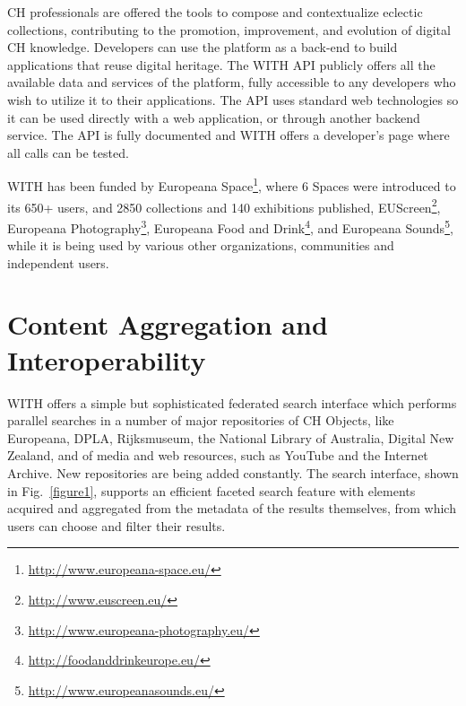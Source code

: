 \documentclass[runningheads,a4paper]{llncs}
\begin{document}
CH professionals are offered the tools to compose and contextualize eclectic collections, contributing to the promotion, improvement, and evolution of digital CH knowledge. Developers can use the platform as a back-end to build applications that reuse digital heritage. The WITH API publicly offers all the available data and services of the platform, fully accessible to any developers who wish to utilize it to their applications. The API uses standard web technologies so it can be used directly with a web application, or through another backend service. The API is fully documented and WITH offers a developer's page where all calls can be tested. 

WITH has been funded by Europeana Space\footnote{\url{http://www.europeana-space.eu/}}, where 6 Spaces were introduced to its 650+ users, and 2850 collections and 140 exhibitions published, EUScreen\footnote{\url{http://www.euscreen.eu/}}, Europeana Photography\footnote{\url{http://www.europeana-photography.eu/}}, Europeana Food and Drink\footnote{\url{http://foodanddrinkeurope.eu/}}, and Europeana Sounds\footnote{\url{http://www.europeanasounds.eu/}}, while it is being used by various other organizations, communities and independent users.

\section{Content Aggregation and Interoperability}

WITH offers a simple but sophisticated federated search interface which performs parallel searches in a number of major repositories of CH Objects, like Europeana, DPLA, Rijksmuseum, the National Library of Australia, Digital New Zealand, and of media and web resources, such as YouTube and the Internet Archive. New repositories are being added constantly. The search interface, shown in Fig.~\ref{figure1}, supports an efficient faceted search feature with elements acquired and aggregated from the metadata of the results themselves, from which users can choose and filter their results. 
\end{document}
